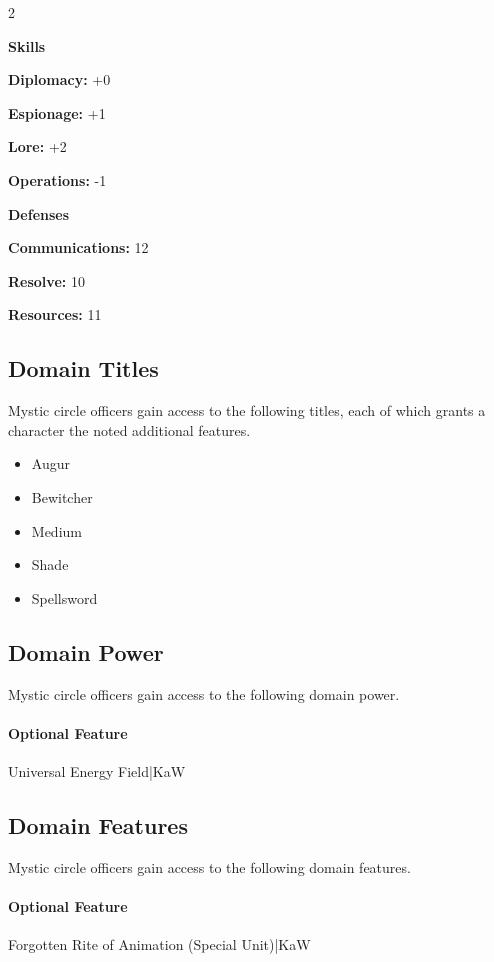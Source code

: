 \documentclass[10pt,a4paper,twoside,bg=print,twocolumn,openany,nodeprecatedcode]{dndbook}
\begin{document}
\begin{itemize}
\begin{multicols}{2}
\item \textbf{Skills}
\item \textbf{Diplomacy:} +0
\item \textbf{Espionage:} +1
\item \textbf{Lore:} +2
\item \textbf{Operations:} -1
\item \textbf{Defenses}
\item \textbf{Communications:} 12
\item \textbf{Resolve:} 10
\item \textbf{Resources:} 11
\end{multicols}

\end{itemize}

\subsection{Domain Titles}
Mystic circle officers gain access to the following titles, each of which grants a character the noted additional features.


\begin{itemize}
\item Augur
\item Bewitcher
\item Medium
\item Shade
\item Spellsword
\end{itemize}

\subsection{Domain Power}
Mystic circle officers gain access to the following domain power.

\paragraph{Optional Feature}
Universal Energy Field|KaW

\subsection{Domain Features}
Mystic circle officers gain access to the following domain features.

\paragraph{Optional Feature}
Forgotten Rite of Animation (Special Unit)|KaW
\end{document}
